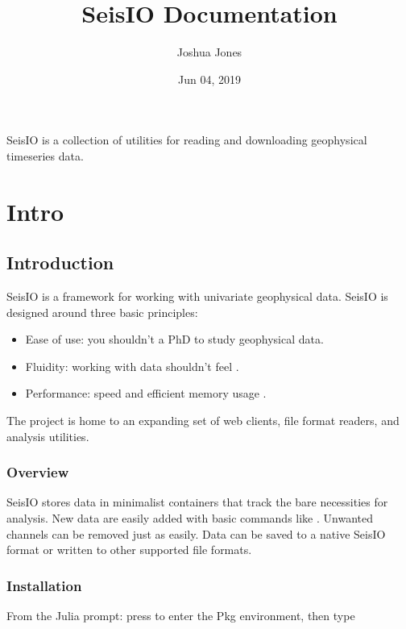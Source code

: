 \documentclass[letterpaper,11pt,english]{sphinxmanual}
\title{SeisIO Documentation}
\date{Jun 04, 2019}
\author{Joshua Jones}
\begin{document}
\pagestyle{empty}
\maketitle
\pagestyle{plain}
\sphinxtableofcontents
\pagestyle{normal}
\label{\detokenize{index::doc}}


SeisIO is a collection of utilities for reading and downloading geophysical timeseries data.


\chapter{Intro}
\label{\detokenize{index:intro}}

\section{Introduction}
\label{\detokenize{src/intro:introduction}}\label{\detokenize{src/intro::doc}}
SeisIO is a framework for working with univariate geophysical data.
SeisIO is designed around three basic principles:
\begin{itemize}
\item {} 
Ease of use: you shouldn’t  a PhD to study geophysical data.

\item {} 
Fluidity: working with data shouldn’t feel .

\item {} 
Performance: speed and efficient memory usage .

\end{itemize}

The project is home to an expanding set of web clients, file format readers,
and analysis utilities.


\subsection{Overview}
\label{\detokenize{src/intro:overview}}
SeisIO stores data in minimalist containers that track the bare necessities for
analysis. New data are easily added with basic commands like \sphinxcode{\sphinxupquote{+}}. Unwanted
channels can be removed just as easily. Data can be saved to a native SeisIO
format or written to other supported file formats.


\subsection{Installation}
\label{\detokenize{src/intro:installation}}
From the Julia prompt: press \sphinxcode{\sphinxupquote{{]}}} to enter the Pkg environment, then type
\end{document}
